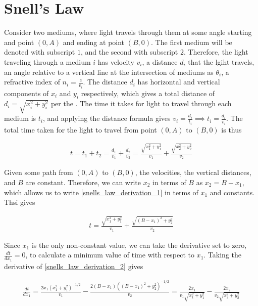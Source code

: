 \section{Snell's Law}

Consider two mediums, where light travels through them at some angle starting and point $(0, A)$ and ending at point $(B, 0)$. The first medium will be denoted with subscript $1$, and the second with subscript $2$. Therefore, the light traveling through a medium $i$ has velocity $v_i$, a distance $d_i$ that the lgiht travels, an angle relative to a vertical line at the intersection of mediums as $\theta_i$, a refractive index of $n_i = \frac{c}{v_i}$. The distance $d_i$ has horizontal and vertical components of $x_i$ and $y_i$ respectively, which gives a total distance of $d_i = \sqrt{x_i^2+y_i^2}$ per the . The time it takes for light to travel through each medium is $t_i$, and applying the distance formula gives $v_i = \frac{d_i}{t_i} \implies t_i = \frac{d_i}{v_i}$. The total time taken for the light to travel from point $(0, A)$ to $(B, 0)$ is thus 

\begin{align}
t=t_1+t_2 = \frac{d_1}{v_1} + \frac{d_2}{v_2} = \frac{\sqrt{x_1^2+y_1^2}}{v_1} + \frac{\sqrt{x_2^2+y_2^2}}{v_2} \label{snells_law_derivation_1}
\end{align}

Given some path from $(0, A)$ to $(B, 0)$, the velocities, the vertical distances, and $B$ are constant. Therefore, we can write $x_2$ in terms of $B$ as $x_2 = B - x_1$, which allows us to write \ref{snells_law_derivation_1} in terms of $x_1$ and constants. Thsi gives

\begin{align}
t = \frac{\sqrt{x_1^2+y_1^2}}{v_1} + \frac{\sqrt{(B - x_1)^2+y_2^2}}{v_2} \label{snells_law_derivation_2}
\end{align}

Since $x_1$ is the only non-constant value, we can take the derivative set to zero, $\frac{dt}{dx_1}=0$, to calculate a minimum value of time with respect to $x_1$. Taking the derivative of \ref{snells_law_derivation_2} gives

\begin{align}
\frac{dt}{dx_1} = \frac{2x_1(x_1^2+y_1^2)^{-1/2}}{v_1} - \frac{2(B - x_1)((B - x_1)^2+y_2^2)^{-1/2}}{v_2} = \frac{2x_1}{v_1\sqrt{x_1^2+y_1^2}} - \frac{2x_2}{v_2\sqrt{x_2^2+y_2^2}} \label{snells_law_derivation_3}
\end{align}

